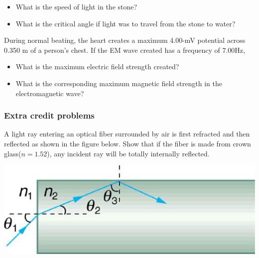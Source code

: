 \documentclass[12pt,addpoints]{exam}
\begin{document}
{{{\begin{questions}
\begin{itemize}
						\item What is the speed of light in the stone?\vspace{0.5in}
						\item What is the critical angle if light was to travel from the stone to water?\vspace{0.5in}
					\end{itemize}
					\question During normal beating, the heart creates a maximum 4.00-mV potential across 0.350 m of a person’s chest. If the EM wave created has a frequency of 7.00Hz,
					\begin{itemize}
						\item What is the maximum electric field strength created?\vspace{0.75in}
						\item What is the corresponding maximum magnetic field strength in the electromagnetic wave?\vspace{0.75in}
					\end{itemize}
					\subsubsection*{Extra credit problems}
					\question A light ray entering an optical fiber surrounded by air is first refracted and then reflected as shown in the figure below. Show that if the fiber is made from crown glass($n=1.52$), any incident ray will be totally internally reflected.
					\begin{center}
						\includegraphics[scale=0.3]{2}
					\end{center}
				\end{questions}
}}}
\end{document}
